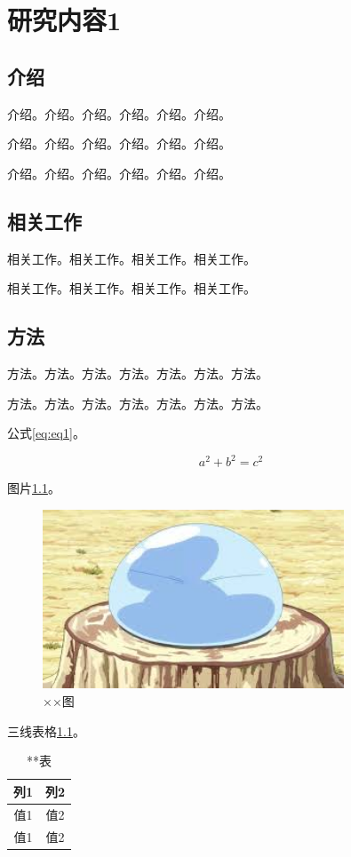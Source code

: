 \chapter{研究内容1}
    \thispagestyle{mainstyle} %
    \section{介绍}
    介绍。介绍。介绍。介绍。介绍。介绍。

    介绍。介绍。介绍。介绍。介绍。介绍。

    介绍。介绍。介绍。介绍。介绍。介绍。

    \section{相关工作}
    相关工作。相关工作。相关工作。相关工作。

    相关工作。相关工作。相关工作。相关工作。

    \section{方法}
    方法。方法。方法。方法。方法。方法。方法。

    方法。方法。方法。方法。方法。方法。方法。

    公式\ref{eq:eq1}。

    \begin{equation}
        a^2 + b^2 = c^2 \label{eq:eq1}
    \end{equation}

    图片\ref{fig:image1}。
    \begin{figure}
        \centering
        \includegraphics[width=0.8\textwidth]{images/image.jpeg}
        \caption{××图}
        \label{fig:image1}
    \end{figure}

    三线表格\ref{tab:table1}。
    \begin{table}
        \centering
        \caption{**表}
        \label{tab:table1}
        \begin{tabular}{c c}
            \toprule[1.5bp]
            列1 & 列2 \\
            \midrule[0.75bp]
            值1 & 值2 \\
            值1 & 值2 \\
            \bottomrule[1.5bp]
        \end{tabular}
    \end{table}

